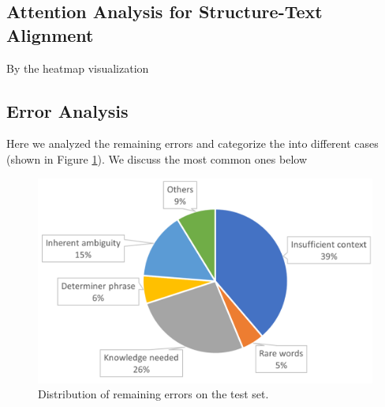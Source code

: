 \subsection{Attention Analysis for Structure-Text Alignment}
By the heatmap visualization

\subsection{Error Analysis}
Here we analyzed the remaining errors and categorize the into different cases  (shown in Figure \ref{error_dist}). We discuss the most common ones below


\begin{figure}[t]
	\centering
	\includegraphics[width=0.9\columnwidth]{case_dist.png}
	\caption{Distribution of remaining errors on the test set.}
	\label{error_dist}
\end{figure}

